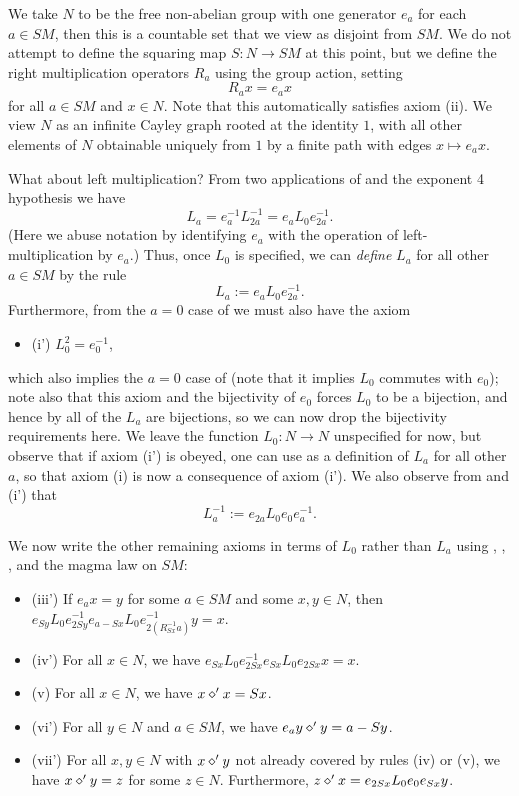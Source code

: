 We take $N$ to be the free non-abelian group with one generator $e_a$ for each $a \in SM$, then this is a countable set that we view as disjoint from $SM$.  We do not attempt to define the squaring map $S: N \to SM$ at this point, but we define the right multiplication operators $R_a$ using the group action, setting
\begin{equation}\label{ra-def}
  R_a x = e_a x
\end{equation}
for all $a \in SM$ and $x \in N$.  Note that this automatically satisfies axiom (ii).  We view $N$ as an infinite Cayley graph rooted at the identity $1$, with all other elements of $N$ obtainable uniquely from $1$ by a finite path with edges $x \mapsto e_a x$.

What about left multiplication?  From two applications of  and the exponent 4 hypothesis we have
$$ L_a = e_a^{-1} L_{2a}^{-1} = e_a L_0 e_{2a}^{-1}.$$
(Here we abuse notation by identifying $e_a$ with the operation of left-multiplication by $e_a$.) Thus, once $L_0$ is specified, we can \emph{define} $L_a$ for all other $a \in SM$ by the rule
\begin{equation}\label{la0}
  L_a := e_a L_0 e_{2a}^{-1}.
\end{equation}
Furthermore, from the $a=0$ case of  we must also have the axiom
\begin{itemize}
  \item (i') $L_0^2 = e_0^{-1}$,
\end{itemize}
which also implies the $a=0$ case of  (note that it implies $L_0$ commutes with $e_0$); note also that this axiom and the bijectivity of $e_0$ forces $L_0$ to be a bijection, and hence by  all of the $L_a$ are bijections, so we can now drop the bijectivity requirements here.  We leave the function $L_0: N \to N$ unspecified for now, but observe that if axiom (i') is obeyed, one can use  as a definition of $L_a$ for all other $a$, so that axiom (i) is now a consequence of axiom (i').  We also observe from  and (i') that
\begin{equation}\label{la1}
  L_a^{-1} := e_{2a} L_0 e_0 e_{a}^{-1}.
\end{equation}

We now write the other remaining axioms in terms of $L_0$ rather than $L_a$ using , , , and the magma law on $SM$:
\begin{itemize}
\item (iii')  If $e_a x = y$ for some $a \in SM$ and some $x,y \in N$, then $e_{Sy} L_0 e_{2Sy}^{-1} e_{a - Sx} L_0 e_{2(R_{Sx}^{-1} a)}^{-1} y = x$.
\item (iv')  For all $x \in N$, we have $e_{Sx} L_0 e_{2Sx}^{-1} e_{Sx} L_0 e_{2Sx} x = x$.
\item (v)  For all $x \in N$, we have $x \diamond' x = Sx$.
\item (vi')  For all $y \in N$ and $a \in SM$, we have $e_a y \diamond' y = a - Sy$.
\item (vii')  For all $x,y \in N$ with $x \diamond' y$ not already covered by rules (iv) or (v), we have $x \diamond' y = z$ for some $z \in N$.  Furthermore, $z \diamond' x = e_{2Sx} L_0 e_0 e_{Sx} y$.
\end{itemize}

